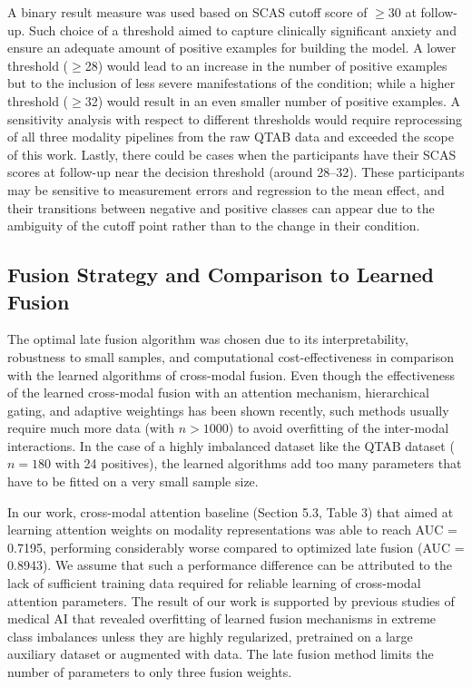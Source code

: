 \documentclass[10pt,letterpaper]{article}
\begin{document}
A binary result measure was used based on SCAS cutoff score of $\geq$30 at follow-up. Such choice of a threshold aimed to capture clinically significant anxiety and ensure an adequate amount of positive examples for building the model. A lower threshold ($\geq$28) would lead to an increase in the number of positive examples but to the inclusion of less severe manifestations of the condition; while a higher threshold ($\geq$32) would result in an even smaller number of positive examples. A sensitivity analysis with respect to different thresholds would require reprocessing of all three modality pipelines from the raw QTAB data and exceeded the scope of this work. Lastly, there could be cases when the participants have their SCAS scores at follow-up near the decision threshold (around 28--32). These participants may be sensitive to measurement errors and regression to the mean effect, and their transitions between negative and positive classes can appear due to the ambiguity of the cutoff point rather than to the change in their condition.                                                                                                               \subsection*{Fusion Strategy and Comparison to Learned Fusion}

                                                                                                                                                                         The optimal late fusion algorithm was chosen due to its interpretability, robustness to small samples, and computational cost-effectiveness in comparison with the learned algorithms of cross-modal fusion. Even though the effectiveness of the learned cross-modal fusion with an attention mechanism, hierarchical gating, and adaptive weightings has been shown recently, such methods usually require much more data (with $n > 1000$) to avoid overfitting of the inter-modal interactions. In the case of a highly imbalanced dataset like the QTAB dataset ($n = 180$ with 24 positives), the learned algorithms add too many parameters that have to be fitted on a very small sample size.

                                                                                                                                                                          In our work, cross-modal attention baseline (Section 5.3, Table 3) that aimed at learning attention weights on modality representations was able to reach AUC = 0.7195, performing considerably worse compared to optimized late fusion (AUC = 0.8943). We assume that such a performance difference can be attributed to the lack of sufficient training data required for reliable learning of cross-modal attention parameters. The result of our work is supported by previous studies of medical AI that revealed overfitting of learned fusion mechanisms in extreme class imbalances unless they are highly regularized, pretrained on a large auxiliary dataset or augmented with data. The late fusion method limits the number of parameters to only three fusion weights.
\end{document}
